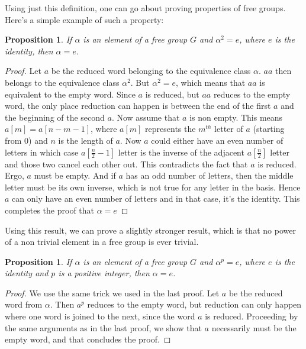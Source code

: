 \documentclass[12pt]{article}
\newtheorem{prop}[thm]{Proposition}
\theoremstyle{definition}
\begin{document}
Using just this definition, one can go about proving properties of free groups. Here's a simple example of such a property:

\begin{prop}\label{double}
If $\alpha$ is an element of a free group $G$ and $\alpha^2=e$, where $e$ is the identity, then $\alpha=e$.
\end{prop}

\begin{proof}
Let $a$ be the reduced word belonging to the equivalence class $\alpha$. $aa$ then belongs to the equivalence class $\alpha^2$. But $\alpha^2=e$, which means that $aa$ is equivalent to the empty word. Since $a$ is reduced, but $aa$ reduces to the empty word, the only place reduction can happen is between the end of the first $a$ and the beginning of the second $a$. Now assume that $a$ is non empty. This means $a[m] = a[n-m-1]$, where $a[m]$ represents the $m^{th}$ letter of $a$ (starting from $0$) and $n$ is the length of $a$. Now $a$ could either have an even number of letters in which case $a\left[\frac{n}{2} -1\right]$ letter is the inverse of the adjacent $a\left[\frac{n}{2}\right]$ letter and those two cancel each other out. This contradicts the fact that $a$ is reduced. Ergo, $a$ must be empty. And if $a$ has an odd number of letters, then the middle letter must be its own inverse, which is not true for any letter in the basis. Hence $a$ can only have an even number of letters and in that case, it's the identity. This completes the proof that $\alpha=e$
\end{proof}

Using this result, we can prove a slightly stronger result, which is that no power of a non trivial element in a free group is ever trivial.

\begin{prop}
If $\alpha$ is an element of a free group $G$ and $\alpha^p=e$, where $e$ is the identity and $p$ is a positive integer, then $\alpha=e$.
\end{prop}

\begin{proof}
We use the same trick we used in the last proof. Let $a$ be the reduced word from $\alpha$. Then $a^p$ reduces to the empty word, but reduction can only happen where one word is joined to the next, since the word $a$ is reduced. Proceeding by the same arguments as in the last proof, we show that $a$ necessarily must be the empty word, and that concludes the proof. 
\end{proof}
\end{document}
